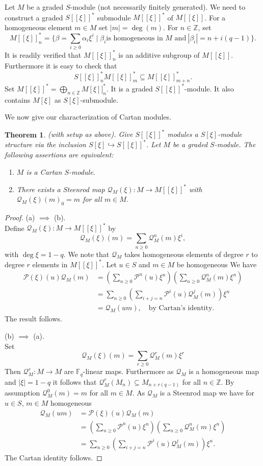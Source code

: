 \documentclass{amsart}
\newcommand{\F}{\mathbb{F} }
\newcommand{\Z}{\mathbb{Z} }
\newcommand{\Pc}{\mathcal{P} }
\newcommand{\Qc}{\mathcal{Q} }
\newcommand{\rt}{\rightarrow}
\theoremstyle{plain}
\newtheorem{theorem}{Theorem}[section]
\theoremstyle{definition}
\theoremstyle{remark}
\begin{document}
\s Let $M$ be a graded $S$-module (not necessarily finitely generated). We need to construct a graded $S[[\xi]]^*$ submodule $ M[[\xi]]^*$ of $M[[\xi]]$.  For a homogeneous element $m \in M$ set $|m| =\deg(m)$.
For $n \in \Z$, set
\[
M[[\xi]]^*_n = \{\beta =  \sum_{i \geq 0} \alpha_i \xi^i \mid  \beta_i \text{is homogeneous in $M$ and} \ |\beta_i| = n + i(q-1)\}.
\]
It is readily verified that $M[[\xi]]^*_n$ is an additive subgroup of $M[[\xi]]$. Furthermore it is easy to check that
$$ S[[\xi]]^*_n M[[\xi]]^*_m \subseteq M[[\xi]]^*_{m+n}.$$
Set $M[[\xi]]^* = \bigoplus_{n \in \Z}M[\xi]]^*_n $. It is a graded $S[[\xi]]^* $-module. It also contains $M[\xi]$ as  $S[\xi]$-submodule.


We now give our characterization of Cartan modules.
\begin{theorem}
\label{char-cartan}(with setup as above). Give $S[[\xi]]^*$ modules a $S[\xi]$-module structure via the inclusion $S[\xi] \hookrightarrow S[[\xi]]^*$.
Let $M$ be a graded $S$-module. The following assertions are equivalent:
\begin{enumerate}[\rm (a)]
  \item $M$ is a Cartan $S$-module.
  \item There exists a Steenrod map $\Qc_M(\xi)\colon M \rt M[[\xi]]^*$ with $\Qc_M(\xi)(m)_0 = m$ for all $m \in M$.
\end{enumerate}
\end{theorem}
\begin{proof}
(a) $\implies$ (b).\\
Define $\Qc_M(\xi) \colon M \rt M[[\xi]]^*$ by
$$\Qc_M(\xi)(m) = \sum_{n \geq 0}\Qc_M^n(m)\xi^i,$$
with $\deg \xi = 1-q$.
We note that $\Qc_M$ takes homogeneous elements of degree $r$ to degree $r$ elements in $M[[\xi]]^*$.
Let $u \in S$ and $m \in M$ be homogeneous
We have \begin{align*}
         \Pc(\xi)(u)\Qc_M(m)  &= \left(\sum_{n \geq 0}\Pc^n(u)\xi^n \right) \left(\sum_{n \geq 0}\Qc^n_M(m)\xi^n \right) \\
          &= \sum_{n \geq 0}\left(\sum_{i+j = n}\Pc^i(u)\Qc^j_M(m)\right)\xi^n \\
           &= \Qc_M(um), \quad \text{by Cartan's identity}.
        \end{align*}
 The result follows.

  (b) $\implies$ (a).\\
  Set $$\Qc_M(\xi)(m) = \sum_{r \geq 0}\Qc_M^r(m)\xi^r$$
  Then $\Qc_M^r \colon M \rt M$ are $\F_q$-linear maps. Furthermore as $\Qc_M$ is a homogeneous map and $|\xi| = 1 -q$ it follows that $\Qc^r_M(M_n) \subseteq M_{n + r(q-1)} $ for all $n \in \Z$.
  By assumption $\Qc_M^0(m) = m$ for all $m \in M$.
  As $\Qc_M$ is a Steenrod map we have for
   $u \in S$, $m \in M$  homogeneous
   \begin{align*}
     \Qc_M(um) &= \Pc(\xi)(u)\Qc_M(m) \\
     &=  \left(\sum_{n \geq 0}\Pc^n(u)\xi^n \right) \left(\sum_{n \geq 0}\Qc^n_M(m)\xi^n \right) \\
     &= \sum_{n \geq 0}\left(\sum_{i+j = n}\Pc^i(u)\Qc^j_M(m)\right)\xi^n.
   \end{align*}
   The Cartan identity follows.
\end{proof}
\end{document}

